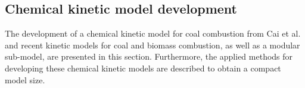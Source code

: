 \begin{refsection}
% 
 

\newpage
\section{Chemical kinetic model development}
The development of a chemical kinetic model for coal combustion from Cai et al.~\cite{Cai2020} and recent kinetic models for coal and biomass combustion, as well as a modular  sub-model, are presented in this section. Furthermore, the applied methods for developing these chemical kinetic models are described to obtain a compact model size.



\end{refsection}
